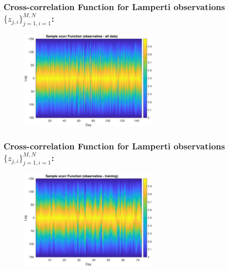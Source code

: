 \documentclass[aspectratio=169]{beamer}\usepackage[utf8]{inputenc}
\begin{document}
\begin{frame}\frametitle{Cross-correlation Function for Lamperti observations $\{z_{j,i}\}_{j=1,i=1}^{M,N}$:}

\begin{figure}[ht!]
\centering
\includegraphics[width=0.6\textwidth]{obs_alldata_L.eps}
\end{figure}

\end{frame}


\begin{frame}\frametitle{Cross-correlation Function for Lamperti observations $\{z_{j,i}\}_{j=1,i=1}^{M,N}$:}

\begin{figure}[ht!]
\centering
\includegraphics[width=0.6\textwidth]{obs_training_L.eps}
\end{figure}

\end{frame}

\end{document}
